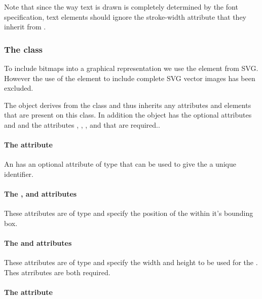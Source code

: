 Note that since the way text is drawn is completely determined by the font specification, text elements should ignore the stroke-width attribute that they inherit from \GraphicalPrimitiveOneD.

\subsubsection{The  class}
\label{image-class}

To include bitmaps into a graphical representation we use the \Image element 
from SVG. However the use of the \Image element to include complete SVG 
vector images has been excluded.


The \Image object derives from the \TransformationTwoD class and thus
inherits any attributes and elements that are present on this class.
In addition the \Image object has the optional attributes  and  and the attributes , , ,  and  that are required..

\paragraph{The \fixttspace{} attribute}

An \Image has an optional attribute  of type  that can be used to give the \Image a unique identifier.

\paragraph{The \fixttspace{}, \fixttspace{} and \fixttspace{}  attributes}

These attributes are of type
\RelAbsVector and specify the position of the \Image within it's bounding box.

\paragraph{The \fixttspace{} and  attributes}

These attributes are of type
\RelAbsVector and specify the width and height to be used for the \Image. Thes atrributes are both required.

\paragraph{The \fixttspace{} attribute}

